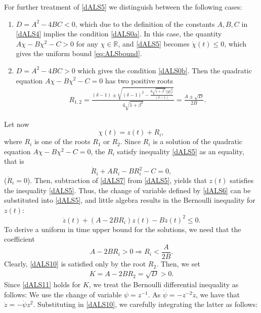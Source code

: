 \documentclass[preprintnumbers,amsmath,amssymb]{revtex4}
\begin{document}
For further treatment of \eqref{dALS5} we distinguish between the following cases:
\begin{enumerate}
	\item $D=A^2-4BC<0$, which due to the definition of the constants $A,B,C$ in \eqref{dALS4} implies the condition \eqref{dALS0a}. In this case, the quantity $A\chi-B\chi^2-C>0$ for any $\chi\in\mathbb{R}$, and \eqref{dALS5} becomes $\dot{\chi}(t)\leq 0$, which gives the uniform bound \eqref{eq:ALSbound}.
	\item  $D=A^2-4BC>0$ which gives the condition \eqref{dALS0b}. Then the quadratic equation $A\chi-B\chi^2-C=0$ has two positive roots
	\begin{eqnarray}
	\label{dALS5r}
	R_{1,2}=\frac{(\delta-1)\pm\sqrt{(\delta-1)^2-\frac{8\sqrt{1+\beta^2}||g||^2_{l^2}}{(\delta-1)}}}{4\sqrt{1+\beta^2}}=\frac{A\pm\sqrt{D}}{2B}.
	\end{eqnarray} 
\end{enumerate}
Let now 
\begin{equation}
\label{dALS6}
\chi(t)=z(t)+R_{i},
\end{equation}
where $R_{i}$ is one of the roots $R_1$ or $R_2$. Since $R_i$ is a solution of the quadratic equation $A\chi-B\chi^2-C=0$, the $R_i$ satisfy inequality \eqref{dALS5} as an equality, that is
\begin{equation}
\label{dALS7}
\dot{R}_i+A R_i-B R_i^2-C=0,
\end{equation}
($\dot{R}_i=0$). Then, subtraction of \eqref{dALS7} from \eqref{dALS5},  yields that $z(t)$  satisfies the inequality \eqref{dALS5}. Thus, the change of variable defined by \eqref{dALS6} can be substituted into \eqref{dALS5}, and little algebra results in the Bernoulli inequality for $z(t)$:
\begin{equation}
\label{dALS9}
\dot{z}(t)+ (A-2BR_i)z(t)-Bz(t)^2\leq 0.
\end{equation}
To derive a uniform in time upper bound for the solutions, we need that the coefficient 
\begin{equation}
\label{dALS10}
A-2BR_i>0\Longrightarrow R_i<\frac{A}{2B}.
\end{equation}
Clearly, \eqref{dALS10} is satisfied only by the root $R_2$. Then, we set
\begin{eqnarray}
\label{dALS11}
K=A-2BR_2=\sqrt{D}>0.
\end{eqnarray}
Since \eqref{dALS11} holds for $K$, we treat the Bernoulli differential inequality as follows:  We use the change of variable $\psi=z^{-1}$. As $\dot{\psi}=-z^{-2}\dot z$, we have that $\dot{z}=-\dot{\psi}z^2$. Substituting in \eqref{dALS10}, we carefully integrating the latter as follows:
\end{document}

